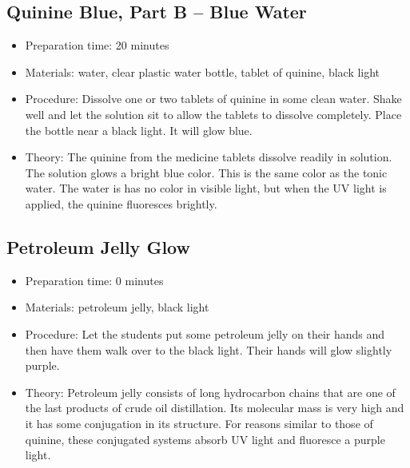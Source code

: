 \subsection{Quinine Blue, Part B – Blue Water}
\begin{itemize}
\item{Preparation time: 20 minutes}
\item{Materials: water, clear plastic water bottle, tablet of quinine, black light}
\item{Procedure: Dissolve one or two tablets of quinine in some clean water. Shake well and let the solution sit to allow the tablets to dissolve completely. Place the bottle near a black light. It will glow blue.}
\item{Theory: The quinine from the medicine tablets dissolve readily in solution. The solution glows a bright blue color. This is the same color as the tonic water. The water is has no color in visible light, but when the UV light is applied, the quinine fluoresces brightly.}
\end{itemize}

\subsection{Petroleum Jelly Glow}
\begin{itemize}
\item{Preparation time: 0 minutes}
\item{Materials: petroleum jelly, black light}
\item{Procedure: Let the students put some petroleum jelly on their hands and then have them walk over to the black light. Their hands will glow slightly purple.}
\item{Theory: Petroleum jelly consists of long hydrocarbon chains that are one of the last products of crude oil distillation. Its molecular mass is very high and it has some conjugation in its structure. For reasons similar to those of quinine, these conjugated systems absorb UV light and fluoresce a purple light. }
\end{itemize}

